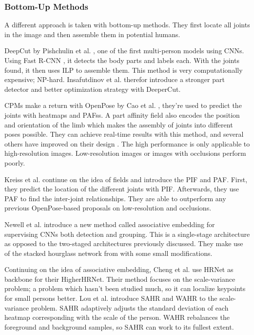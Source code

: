 \subsubsection{Bottom-Up Methods}
A different approach is taken with bottom-up methods.
They first locate all joints in the image and then assemble them in potential humans.

DeepCut by Pishchulin et al. \cite{Pishchulin2015}, one of the first multi-person models using \glspl{CNN}.
Using Fast R-CNN \cite{Ren2015}, it detects the body parts and labels each.
With the joints found, it then uses \gls{ILP} to assemble them.
This method is very computationally expensive; NP-hard.
Insafutdinov et al. \cite{Insafutdinov2016} therefor introduce a stronger part detector and better optimization strategy with DeeperCut.

\gls{CPMs} make a return with OpenPose by Cao et al. \cite{Cao2018}, they're used to predict the joints with heatmaps and \glspl{PAFs}.
A part affinity field also encodes the position and orientation of the limb which makes the assembly of joints into different poses possible.
They can achieve real-time results with this method, and several others have improved on their design \cite{Zhu2017}\cite{Hidalgo2019}\cite{Li2019}.
The high performance is only applicable to high-resolution images.
Low-resolution images or images with occlusions perform poorly.

Kreiss et al. \cite{Kreiss2019} continue on the idea of fields and introduce the \gls{PIF} and \gls{PAF}.
First, they predict the location of the different joints with \gls{PIF}.
Afterwards, they use \gls{PAF} to find the inter-joint relationships.
They are able to outperform any previous OpenPose-based proposals on low-resolution and occlusions.

Newell et al. \cite{Newell2016-2} introduce a new method called associative embedding for supervising \glspl{CNN} both detection and grouping.
This is a single-stage architecture as opposed to the two-staged architectures previously discussed.
They make use of the stacked hourglass network from \cite{Newell2016} with some small modifications.

Continuing on the idea of associative embedding, Cheng et al. \cite{Cheng2019} use HRNet \cite{Sun2019} as backbone for their HigherHRNet.
Their method focuses on the scale-variance problem; a problem which hasn't been studied much, so it can localize keypoints for small persons better.
Lou et al. \cite{Lou2020} introduce \gls{SAHR} and \gls{WAHR} to the scale-variance problem.
\gls{SAHR} adaptively adjusts the standard deviation of each heatmap corresponding with the scale of the person.
\gls{WAHR} rebalances the foreground and background samples, so \gls{SAHR} can work to its fullest extent.

